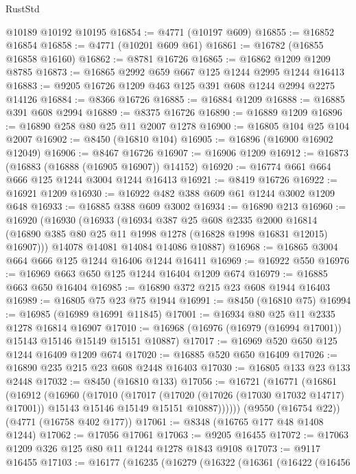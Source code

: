 \begin{lexlean}{RustStd}
\begin{coremodule}
    @10189
    @10192
    @10195
@16854 := @4771 (@10197 @609)
@16855 := @16852 @16854
@16858 := @4771 (@10201 @609 @61)
@16861 := @16782 (@16855 @16858 @16160)
@16862 := @8781 @16726
@16865 := @16862 @1209 @1209 @8785
@16873 := @16865 @2992 @659 @667 @125 @1244 @2995 @1244 @16413
@16883 := @9205 @16726 @1209 @463 @125 @391 @608 @1244 @2994 @2275 @14126
@16884 := @8366 @16726
@16885 := @16884 @1209
@16888 := @16885 @391 @608 @2994
@16889 := @8375 @16726
@16890 := @16889 @1209
@16896 := @16890 @258 @80 @25 @11 @2007 @1278
@16900 := @16805 @104 @25 @104 @2007
@16902 := @8450 (@16810 @104)
@16905 := @16896 (@16900 @16902 @12049)
@16906 := @8467 @16726
@16907 := @16906 @1209
@16912 := @16873 (@16883 (@16888 (@16905 @16907)) @14152)
@16920 := @16774 @661 @664 @666 @125 @1244 @3004 @1244 @16413
@16921 := @8419 @16726
@16922 := @16921 @1209
@16930 := @16922 @482 @388 @609 @61 @1244 @3002 @1209 @648
@16933 := @16885 @388 @609 @3002
@16934 := @16890 @213
@16960 := @16920
    (@16930
      (@16933
        (@16934
          @387
          @25
          @608
          @2335
          @2000
          @16814
          (@16890 @385 @80 @25 @11 @1998 @1278 (@16828 @1998 @16831 @12015) @16907)))
      @14078
      @14081
      @14084
      @14086
      @10887)
@16968 := @16865 @3004 @664 @666 @125 @1244 @16406 @1244 @16411
@16969 := @16922 @550
@16976 := @16969 @663 @650 @125 @1244 @16404 @1209 @674
@16979 := @16885 @663 @650 @16404
@16985 := @16890 @372 @215 @23 @608 @1944 @16403
@16989 := @16805 @75 @23 @75 @1944
@16991 := @8450 (@16810 @75)
@16994 := @16985 (@16989 @16991 @11845)
@17001 := @16934 @80 @25 @11 @2335 @1278 @16814 @16907
@17010 := @16968 (@16976 (@16979 (@16994 @17001)) @15143 @15146 @15149 @15151 @10887)
@17017 := @16969 @520 @650 @125 @1244 @16409 @1209 @674
@17020 := @16885 @520 @650 @16409
@17026 := @16890 @235 @215 @23 @608 @2448 @16403
@17030 := @16805 @133 @23 @133 @2448
@17032 := @8450 (@16810 @133)
@17056 := @16721
    (@16771
      (@16861
        (@16912
          (@16960
            (@17010
              (@17017
                (@17020 (@17026 (@17030 @17032 @14717) @17001))
                @15143
                @15146
                @15149
                @15151
                @10887))))))
    (@9550 (@16754 @22))
    (@4771 (@16758 @402 @177))
@17061 := @8348 (@16765 @177 @48 @1408 @1244)
@17062 := @17056 @17061
@17063 := @9205 @16455
@17072 := @17063 @1209 @326 @125 @80 @11 @1244 @1278 @1843 @9108
@17073 := @9117 @16455
@17103 := @16177
    (@16235
      (@16279
        (@16322
          (@16361
            (@16422
              (@16456

\end{coremodule}
\end{lexlean}
